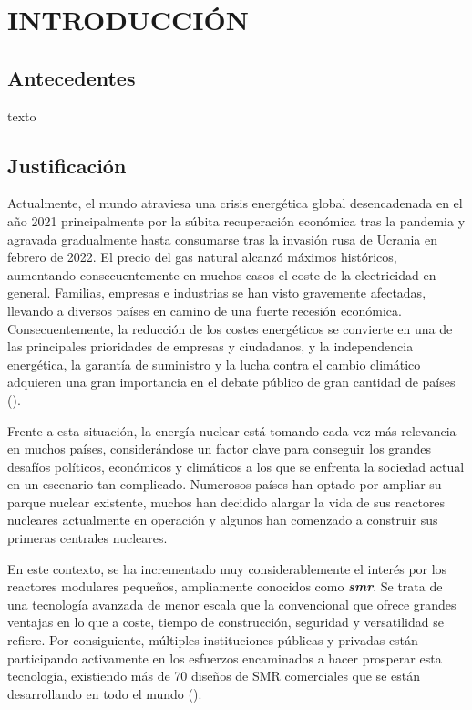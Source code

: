 \section{INTRODUCCIÓN} \label{sec:introduccion}

\subsection{Antecedentes}
texto
\subsection{Justificación}

Actualmente, el mundo atraviesa una crisis energética global desencadenada en el año 2021 principalmente por la súbita recuperación económica tras la pandemia y agravada gradualmente hasta consumarse tras la invasión rusa de Ucrania en febrero de 2022. El precio del gas natural alcanzó máximos históricos, aumentando consecuentemente en muchos casos el coste de la electricidad en general. Familias, empresas e industrias se han visto gravemente afectadas, llevando a diversos países en camino de una fuerte recesión económica. Consecuentemente, la reducción de los costes energéticos se convierte en una de las principales prioridades de empresas y ciudadanos, y la independencia energética, la
garantía de suministro y la lucha contra el cambio climático adquieren una gran importancia en el debate público de gran cantidad de países (\cite{crisis_energetica_iea}). 

Frente a esta situación, la energía nuclear está tomando cada vez más relevancia en muchos países, considerándose un factor clave para conseguir los grandes desafíos políticos, económicos y climáticos  a los que se enfrenta la sociedad actual en un escenario tan complicado. Numerosos países han optado por ampliar su parque nuclear existente, muchos han decidido alargar la vida de sus reactores nucleares actualmente en operación y algunos han comenzado a construir sus primeras centrales nucleares. 

En este contexto, se ha incrementado muy considerablemente el interés por los reactores modulares pequeños, ampliamente conocidos como \textbf{\emph{\acrfull{smr}}}. Se trata de una tecnología avanzada de menor escala que la convencional que ofrece grandes ventajas en lo que a coste, tiempo de construcción, seguridad y versatilidad se refiere. Por consiguiente, múltiples instituciones públicas y privadas están participando activamente en los esfuerzos encaminados a hacer prosperar esta tecnología, existiendo más de 70 diseños de SMR comerciales que se están desarrollando en todo el mundo (\cite{smr_oiea}).

